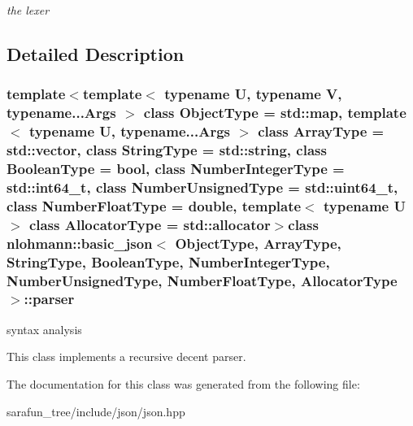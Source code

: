 \begin{DoxyCompactItemize}
\begin{DoxyCompactList}\small\item\em the lexer \end{DoxyCompactList}\end{DoxyCompactItemize}


\subsection{Detailed Description}
\subsubsection*{template$<$template$<$ typename U, typename V, typename...\-Args $>$ class Object\-Type = std\-::map, template$<$ typename U, typename...\-Args $>$ class Array\-Type = std\-::vector, class String\-Type = std\-::string, class Boolean\-Type = bool, class Number\-Integer\-Type = std\-::int64\-\_\-t, class Number\-Unsigned\-Type = std\-::uint64\-\_\-t, class Number\-Float\-Type = double, template$<$ typename U $>$ class Allocator\-Type = std\-::allocator$>$class nlohmann\-::basic\-\_\-json$<$ Object\-Type, Array\-Type, String\-Type, Boolean\-Type, Number\-Integer\-Type, Number\-Unsigned\-Type, Number\-Float\-Type, Allocator\-Type $>$\-::parser}

syntax analysis 

This class implements a recursive decent parser. 

The documentation for this class was generated from the following file\-:\begin{DoxyCompactItemize}
\item 
sarafun\-\_\-tree/include/json/json.\-hpp\end{DoxyCompactItemize}
